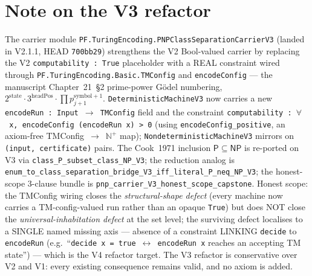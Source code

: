 \documentclass[11pt,a4paper]{article}
\theoremstyle{plain}
\theoremstyle{definition}
\begin{document}
\section*{Note on the V3 refactor}

The carrier module
\texttt{PF.TuringEncoding.PNPClassSeparationCarrierV3}
(landed in V2.1.1, HEAD \texttt{700bb29}) strengthens the V2
Bool-valued carrier by replacing the V2
\texttt{computability~:~True} placeholder with a REAL constraint
wired through \texttt{PF.TuringEncoding.Basic.TMConfig} and
\texttt{encodeConfig} --- the manuscript Chapter~21~\S2 prime-power
G\"odel numbering, $2^{\mathrm{state}} \cdot 3^{\mathrm{headPos}}
\cdot \prod p_{j+1}^{\mathrm{symbol}+1}$.
\texttt{DeterministicMachineV3} now carries a new
\texttt{encodeRun~:~Input~$\to$~TMConfig} field and the constraint
\texttt{computability~:~$\forall$~x,~encodeConfig~(encodeRun~x)~>~0}
(using \texttt{encodeConfig\_positive}, an axiom-free
TMConfig~$\to$~$\mathbb{N}^+$ map);
\texttt{NondeterministicMachineV3} mirrors on
\texttt{(input,~certificate)} pairs.  The Cook~1971 inclusion
$\mathsf{P} \subseteq \mathsf{NP}$ is re-ported on V3 via
\texttt{class\_P\_subset\_class\_NP\_V3}; the reduction analog is
\texttt{enum\_to\_class\_separation\_bridge\_V3\_iff\_literal\_P\_neq\_NP\_V3};
the honest-scope 3-clause bundle is
\texttt{pnp\_carrier\_V3\_honest\_scope\_capstone}.  Honest scope:
the TMConfig wiring closes the \emph{structural-shape defect}
(every machine now carries a TM-config-valued run rather than an
opaque \texttt{True}) but does NOT close the
\emph{universal-inhabitation defect} at the set level; the
surviving defect localises to a SINGLE named missing axis ---
absence of a constraint LINKING \texttt{decide} to \texttt{encodeRun}
(e.g.\ ``\texttt{decide~x~=~true~$\leftrightarrow$~encodeRun~x}
reaches an accepting TM state'') --- which is the V4 refactor
target.  The V3 refactor is conservative over V2 and V1: every
existing consequence remains valid, and no axiom is added.
\end{document}
